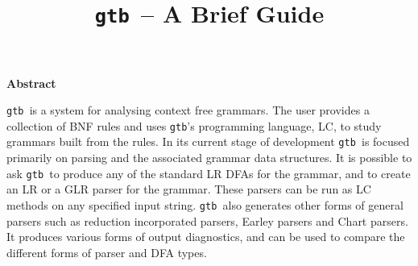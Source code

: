 
\newcommand{\derive}{{\mathop{\Rightarrow}\limits^*}}
\newcommand{\mderive}[1]{{\mathop{\Rightarrow}\limits^{#1}}}
\newcommand{\rmderive}[1]{{\mathop{\Rightarrow}\limits_{#1}}}
\newcommand{\mderives}[1]{{\ \mathop{\Rightarrow}\limits^{#1}\ }}
\newcommand{\pdn}{::=}

\newcommand{\miter}[4]{({#1})\kern 2pt_{#2}{\tt @}_{#3}\kern 2pt{{\tt #4}}}
\newcommand{\iter}[4]{({#1}){#2}{\tt @}{#3}{#4}}

\newcommand{\first}{\mbox{\sc first}}
\newcommand{\follow}{\mbox{\sc follow}}
\newcommand{\FIRST}{\mbox{\sc first}}
\newcommand{\FOLLOW}{\mbox{\sc follow}}

\newcommand{\red}{{\cal R}}
\newcommand{\epty}{\epsilon}
\newcommand{\rec}[1]{{#1}^{\perp}}

\newcommand{\rdpsupp}{{\mediumseries\tt rdp\_supp}}
\newcommand{\rdp}{{\mediumseries\tt rdp}}
\newcommand{\gtb}{{\mediumseries\tt gtb\ }}
\newcommand{\gtbs}{{\mediumseries\tt gtb}}
\newcommand{\rdps}{{\mediumseries\tt rdp\ }}

\newcommand{\mypage}[1]{\hspace*{\fill}p\pageref{#1} }

\newcommand{\lj}{\hspace*{\fill}}

\newtheorem{thm}{Theorem}
\newtheorem{prop}{Proposition}
\newtheorem{cor}{Corollary}

\title{\gtb -- A Brief Guide}



\thispagestyle{empty}
\vspace*{1cm}
\begin{center}{\bf Abstract}\end{center}

\gtb is a system for analysing context free grammars. The user
provides a collection of BNF rules and uses \gtbs's programming
language, LC, to
study grammars built from the rules. In its current stage of
development \gtb is focused primarily on parsing and the associated
grammar data structures. It is 
possible to ask \gtb to produce any of the standard LR DFAs for the
grammar, and to create an LR or a GLR parser for the grammar.
These parsers can be run as LC methods on any specified
input string. \gtb also generates other forms of general parsers such
as reduction incorporated parsers, Earley parsers and Chart parsers.
It produces various forms of output diagnostics, and can be used to
compare the different forms of parser and DFA types.

